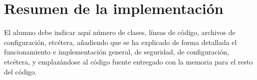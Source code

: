 \section{\forlnameref Resumen de la implementación}
\label{sec:implementationResume}

\begin{shaded}
El alumno debe indicar aquí número de clases, líneas de código, archivos de configuración, etcétera, añadiendo que se ha explicado de forma detallada el funcionamiento e implementación general, de seguridad, de configuración, etcétera, y emplazándose al código fuente entregado con la memoria para el resto del código.
\end{shaded}